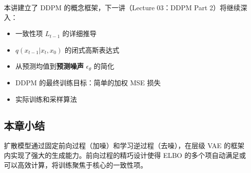本讲建立了 DDPM 的概念框架，下一讲（Lecture 03：DDPM Part 2）将继续深入：

\begin{itemize}
    \item 一致性项 $L_{t-1}$ 的详细推导
    \item $q(x_{t-1}|x_t, x_0)$ 的闭式高斯表达式
    \item 从预测均值到\textbf{预测噪声} $\epsilon_\theta$ 的简化
    \item DDPM 的最终训练目标：简单的加权 MSE 损失
    \item 实际训练和采样算法
\end{itemize}

\subsection{本章小结}

扩散模型通过固定前向过程（加噪）和学习逆过程（去噪），在层级 VAE 的框架内实现了强大的生成能力。前向过程的精巧设计使得 ELBO 的多个项自动满足或可以高效计算，将训练聚焦于核心的一致性项。


